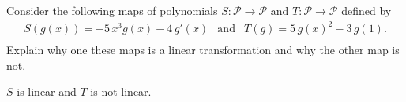 
\begin{exerciseStatement}


Consider the following maps of polynomials \(S:\mathcal{P}\rightarrow\mathcal{P}\) and \(T:\mathcal{P}\rightarrow\mathcal{P}\) defined by 
\begin{align*} S(g(x))= -5 \, x^{3} g\left(x\right) - 4 \, g'\left(x\right)  & \text{and} & T(g)= 5 \, g\left(x\right)^{2} - 3 \, g\left(1\right) . \\ \end{align*}
             Explain why one these maps is a linear transformation and why the other map is not. 


\end{exerciseStatement}
    
\begin{exerciseAnswer} 


\(S\) is linear and \(T\) is not linear.


\end{exerciseAnswer}
    
